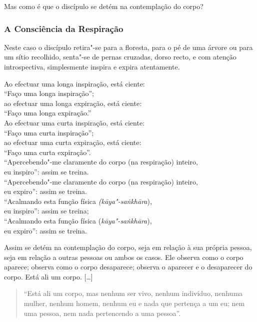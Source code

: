 
Mas como é que o discípulo se detém na contemplação do corpo?

\subsubsection{A Consciência da Respiração}


Neste caso o discípulo retira"-se para a floresta, para o pé de uma árvore ou
para um sítio recolhido, senta"-se de pernas cruzadas, dorso recto, e com atenção
introspectiva, simplesmente inspira e expira atentamente.

Ao efectuar uma longa inspiração, está ciente:\\
“Faço uma longa inspiração”;\\
ao efectuar uma longa expiração, está ciente:\\
“Faço uma longa expiração.”\\
Ao efectuar uma curta inspiração, está ciente:\\
“Faço uma curta inspiração”;\\
ao efectuar uma curta expiração, está ciente:\\
“Faço uma curta expiração”.\\
“Apercebendo"-me claramente do corpo (na respiração) inteiro,\\
eu inspiro”: assim se treina.\\
“Apercebendo"-me claramente do corpo (na respiração) inteiro,\\
eu expiro”: assim se treina.\\
“Acalmando esta função física \emph{(kāya"-saṅkhāra}),\\
eu inspiro”: assim se treina;\\
“Acalmando esta função física (\emph{kāya"-saṅkhāra}),\\
eu expiro”: assim se treina.

Assim se detém na contemplação do corpo, seja em relação à sua própria pessoa,
seja em relação a outras pessoas ou ambos os casos. Ele observa como o corpo
aparece; observa como o corpo desaparece; observa o aparecer e o desaparecer do
corpo. Está ali um corpo. [\ldots]

\begin{quote}
  “Está ali um corpo, mas nenhum ser vivo, nenhum indivíduo, nenhuma mulher,
  nenhum homem, nenhum eu e nada que pertença a um eu; nem uma pessoa, nem nada
  pertencendo a uma pessoa”.
\end{quote}

